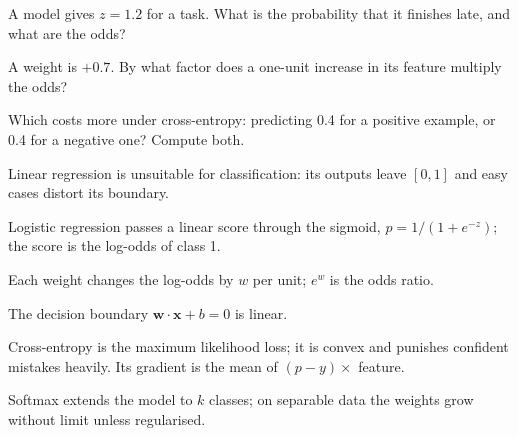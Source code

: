 \begin{checkpoint}
\begin{tightnum}
  \item A model gives $z = 1.2$ for a task. What is the probability that it
        finishes late, and what are the odds?
  \item A weight is $+0.7$. By what factor does a one-unit increase in its feature
        multiply the odds?
  \item Which costs more under cross-entropy: predicting 0.4 for a positive
        example, or 0.4 for a negative one? Compute both.
\end{tightnum}
\end{checkpoint}

\begin{chaptersummary}
\begin{tight}
  \item Linear regression is unsuitable for classification: its outputs leave
        $[0,1]$ and easy cases distort its boundary.
  \item Logistic regression passes a linear score through the sigmoid,
        $p = 1/(1 + e^{-z})$; the score is the log-odds of class 1.
  \item Each weight changes the log-odds by $w$ per unit; $e^w$ is the odds ratio.
  \item The decision boundary $\mathbf{w}\cdot\mathbf{x} + b = 0$ is linear.
  \item Cross-entropy is the maximum likelihood loss; it is convex and punishes
        confident mistakes heavily. Its gradient is the mean of
        $(p - y) \times$ feature.
  \item Softmax extends the model to $k$ classes; on separable data the weights
        grow without limit unless regularised.
\end{tight}
\end{chaptersummary}

